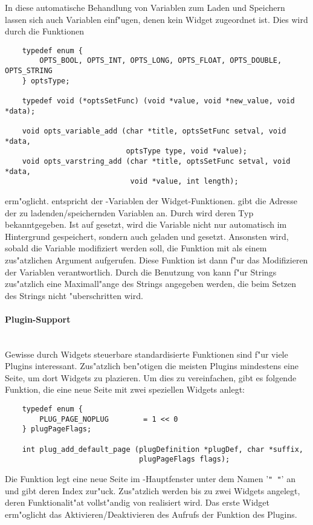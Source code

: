 In diese automatische Behandlung von Variablen zum Laden und
Speichern lassen sich auch Variablen einf"ugen, denen kein Widget
zugeordnet ist. Dies wird durch die Funktionen
\begin{small}
\linespread{0.9}
\begin{verbatim}
    typedef enum {
        OPTS_BOOL, OPTS_INT, OPTS_LONG, OPTS_FLOAT, OPTS_DOUBLE, OPTS_STRING
    } optsType;

    typedef void (*optsSetFunc) (void *value, void *new_value, void *data);

    void opts_variable_add (char *title, optsSetFunc setval, void *data,
                            optsType type, void *value);
    void opts_varstring_add (char *title, optsSetFunc setval, void *data,
                             void *value, int length);
\end{verbatim}
\end{small}
erm"oglicht.  entspricht der -Variablen der
Widget-Funktionen.  gibt die Adresse der zu
ladenden/speichernden Variablen an. Durch  wird deren Typ
bekanntgegeben. Ist  auf  gesetzt, wird die
Variable nicht nur automatisch im Hintergrund gespeichert, sondern
auch geladen und gesetzt. Ansonsten wird, sobald die Variable
modifiziert werden soll, die Funktion  mit 
als einem zus"atzlichen Argument aufgerufen. Diese Funktion ist dann
f"ur das Modifizieren der Variablen verantwortlich. Durch die
Benutzung von  kann f"ur Strings
zus"atzlich eine Maximall"ange des Strings angegeben werden, die
beim Setzen des Strings nicht "uberschritten wird.

\paragraph{Plugin-Support}\hfill\\

Gewisse durch Widgets steuerbare standardisierte Funktionen sind f"ur
viele Plugins interessant. Zus"atzlich ben"otigen die meisten
Plugins mindestens eine Seite, um dort Widgets zu plazieren. Um dies
zu vereinfachen, gibt es folgende Funktion, die eine neue Seite mit
zwei speziellen Widgets anlegt:
\begin{small}
\linespread{0.9}
\begin{verbatim}
    typedef enum {
        PLUG_PAGE_NOPLUG        = 1 << 0
    } plugPageFlags;

    int plug_add_default_page (plugDefinition *plugDef, char *suffix,
                               plugPageFlags flags);
\end{verbatim}
\end{small}
Die Funktion legt eine neue Seite im \icewing{}-Hauptfenster unter
dem Namen '\verb|" "|' an und gibt deren
Index zur"uck. Zus"atzlich werden bis zu zwei Widgets angelegt, deren
Funktionalit"at vollst"andig von \icewing{} realisiert wird. Das
erste Widget erm"oglicht das Aktivieren/Deaktivieren des Aufrufs der
 Funktion des Plugins.

